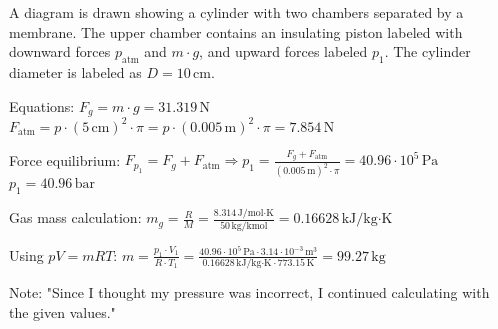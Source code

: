 A diagram is drawn showing a cylinder with two chambers separated by a membrane. The upper chamber contains an insulating piston labeled with downward forces \( p_{\text{atm}} \) and \( m \cdot g \), and upward forces labeled \( p_1 \). The cylinder diameter is labeled as \( D = 10 \, \text{cm} \).  

Equations:  
\( F_g = m \cdot g = 31.319 \, \text{N} \)  
\( F_{\text{atm}} = p \cdot (5 \, \text{cm})^2 \cdot \pi = p \cdot (0.005 \, \text{m})^2 \cdot \pi = 7.854 \, \text{N} \)  

Force equilibrium:  
\( F_{p_1} = F_g + F_{\text{atm}} \Rightarrow p_1 = \frac{F_g + F_{\text{atm}}}{(0.005 \, \text{m})^2 \cdot \pi} = 40.96 \cdot 10^5 \, \text{Pa} \)  
\( p_1 = 40.96 \, \text{bar} \)  

Gas mass calculation:  
\( m_g = \frac{R}{M} = \frac{8.314 \, \text{J/mol·K}}{50 \, \text{kg/kmol}} = 0.16628 \, \text{kJ/kg·K} \)  

Using \( pV = mRT \):  
\( m = \frac{p_1 \cdot V_1}{R \cdot T_1} = \frac{40.96 \cdot 10^5 \, \text{Pa} \cdot 3.14 \cdot 10^{-3} \, \text{m}^3}{0.16628 \, \text{kJ/kg·K} \cdot 773.15 \, \text{K}} = 99.27 \, \text{kg} \)  

Note:  
"Since I thought my pressure was incorrect, I continued calculating with the given values."